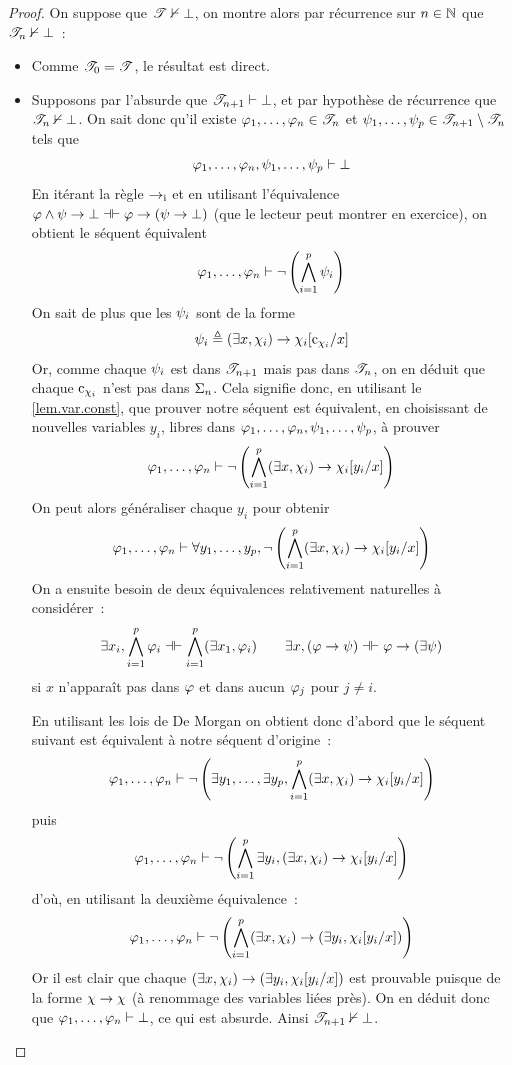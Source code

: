 \begin{proof}
  On suppose que $\mathscr T\nvdash\bot$, on montre alors par récurrence sur
  $n \in \mathbb N$ que $\mathscr T_n\nvdash\bot$~:
  \begin{itemize}
  \item Comme $\mathscr T_0 =\mathscr T$, le résultat est direct.
  \item Supposons par l'absurde que $\mathscr T_{n+1}\vdash \bot$, et par
    hypothèse de récurrence que $\mathscr T_n\nvdash \bot$. On sait donc qu'il
    existe $\varphi_1,\ldots,\varphi_n \in \mathscr T_n$ et
    $\psi_1,\ldots,\psi_p \in \mathscr T_{n+1}\setminus \mathscr T_n$
    tels que
    \[\varphi_1,\ldots,\varphi_n,\psi_1,\ldots,\psi_p\vdash \bot\]
    En itérant la règle $\mathord{\to}_{\mathrm{i}}$ et en utilisant l'équivalence
    $\varphi\land \psi \to \bot \mathrel{\mathord{\dashv}\mathord{\vdash}} \varphi \to (\psi \to \bot)$
    (que le lecteur peut
    montrer en exercice), on obtient le séquent équivalent
    \[\varphi_1,\ldots,\varphi_n\vdash
    \lnot\left(\bigwedge_{i = 1}^p \psi_i\right)\]
    On sait de plus que les $\psi_i$ sont de la forme
    \[\psi_i \triangleq (\exists x, \chi_i) \to \chi_i[\mathrm{c}_{\chi_i}/x]\]
    Or, comme chaque $\psi_i$ est dans $\mathscr T_{n+1}$ mais pas dans
    $\mathscr T_n$, on en déduit que chaque $\mathrm{c}_{\chi_i}$ n'est pas dans $\Sigma_n$.
    Cela signifie donc, en utilisant le \cref{lem.var.const}, que prouver notre
    séquent est équivalent, en choisissant de nouvelles variables $y_i$, libres
    dans $\varphi_1,\ldots,\varphi_n,\psi_1,\ldots,\psi_p$, à prouver
    \[\varphi_1,\ldots,\varphi_n\vdash \lnot \left(\bigwedge_{i = 1}^p
    (\exists x, \chi_i) \to \chi_i[y_i/x]\right)\]
    On peut alors généraliser chaque $y_i$ pour obtenir
    \[\varphi_1,\ldots,\varphi_n\vdash \forall y_1,\ldots,y_p, \lnot \left(
    \bigwedge_{i=1}^p(\exists x, \chi_i) \to \chi_i[y_i/x]\right)\]
    On a ensuite besoin de deux équivalences relativement naturelles à
    considérer~:
    \[\exists x_i, \bigwedge_{i = 1}^p \varphi_i\mathrel{\mathord{\dashv}\mathord{\vdash}}
    \bigwedge_{i = 1}^p(\exists x_1, \varphi_i)\qquad
    \exists x, (\varphi \to \psi) \mathrel{\mathord{\dashv}\mathord{\vdash}} \varphi \to (\exists \psi)\]
    si $x$ n'apparaît pas dans $\varphi$ et dans aucun $\varphi_j$ pour
    $j \neq i$.

    En utilisant les lois de De Morgan on obtient donc d'abord que le séquent
    suivant est équivalent à notre séquent d'origine~:
    \[\varphi_1,\ldots,\varphi_n\vdash \lnot\left(\exists y_1,\ldots,\exists y_p,
    \bigwedge_{i = 1}^p (\exists x, \chi_i) \to \chi_i[y_i/x]\right)\]
    puis 
    \[\varphi_1,\ldots,\varphi_n\vdash \lnot\left(\bigwedge_{i = 1}^p
    \exists y_i,(\exists x, \chi_i) \to \chi_i[y_i/x]\right)\]
    d'où, en utilisant la deuxième équivalence~:
    \[\varphi_1,\ldots,\varphi_n\vdash \lnot\left(\bigwedge_{i = 1}^p
    (\exists x, \chi_i) \to (\exists y_i, \chi_i[y_i/x])\right)\]
    Or il est clair que chaque
    $(\exists x, \chi_i)\to (\exists y_i, \chi_i[y_i/x])$
    est prouvable puisque de la forme $\chi \to \chi$
    (à renommage des variables liées près).
    On en déduit donc que $\varphi_1,\ldots,\varphi_n\vdash \bot$, ce qui est
    absurde. Ainsi $\mathscr T_{n+1}\nvdash \bot$.
  \end{itemize}


\end{proof}
